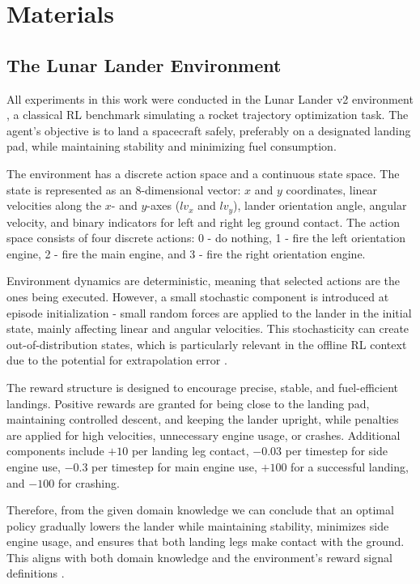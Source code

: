 \cleardoubleoddpage
\chapter{Materials}
\label{app:Datasets_and_the_Environment}

\section{The Lunar Lander Environment}
\label{sec:the_lunar_lande_environment}

All experiments in this work were conducted in the Lunar Lander v2 environment \cite{LunarLanderEnv}, a classical RL benchmark simulating a rocket trajectory optimization task. The agent’s objective is to land a spacecraft safely, preferably on a designated landing pad, while maintaining stability and minimizing fuel consumption.

The environment has a discrete action space and a continuous state space. The state is represented as an 8-dimensional vector: $x$ and $y$ coordinates, linear velocities along the $x$- and $y$-axes ($lv_x$ and $lv_y$), lander orientation angle, angular velocity, and binary indicators for left and right leg ground contact. The action space consists of four discrete actions: 0 - do nothing, 1 - fire the left orientation engine, 2 - fire the main engine, and 3 - fire the right orientation engine.

Environment dynamics are deterministic, meaning that selected actions are the ones being executed. However, a small stochastic component is introduced at episode initialization - small random forces are applied to the lander in the initial state, mainly affecting linear and angular velocities. This stochasticity can create out-of-distribution states, which is particularly relevant in the offline RL context due to the potential for extrapolation error \cite{lange2012batch}.

The reward structure is designed to encourage precise, stable, and fuel-efficient landings. Positive rewards are granted for being close to the landing pad, maintaining controlled descent, and keeping the lander upright, while penalties are applied for high velocities, unnecessary engine usage, or crashes. Additional components include $+10$ per landing leg contact, $-0.03$ per timestep for side engine use, $-0.3$ per timestep for main engine use, $+100$ for a successful landing, and $-100$ for crashing.

Therefore, from the given domain knowledge we can conclude that an optimal policy gradually lowers the lander while maintaining stability, minimizes side engine usage, and ensures that both landing legs make contact with the ground. This aligns with both domain knowledge and the environment’s reward signal definitions \cite{LunarLanderEnv}.




